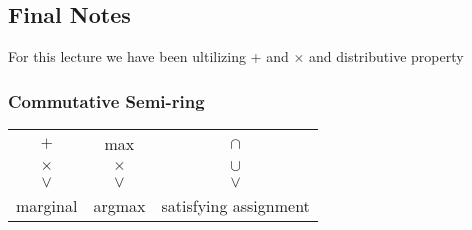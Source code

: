 \documentclass{article}
\begin{document}
\subsection{Final Notes}
For this lecture we have been ultilizing + and $\times$ and distributive property
\subsubsection{Commutative Semi-ring}
\begin{center}
\begin{tabular}{ c c c }
$+$ & max & $\cap$\\
 $\times$ & $\times$& $\cup$ \\
 $ \vee$&  $ \vee$&  $\vee$\\
 marginal & argmax & satisfying assignment
\end{tabular}
\end{center}
\end{document}
